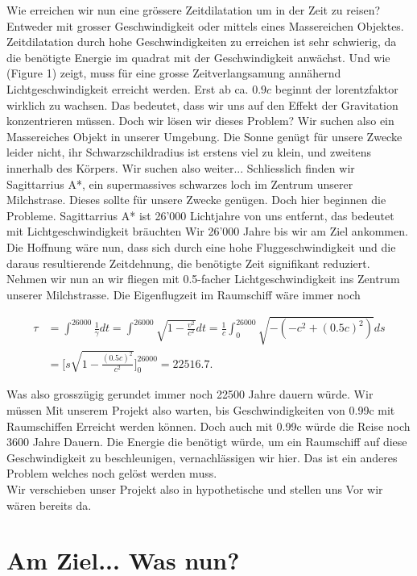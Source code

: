 \begin{refsection}
	Wie erreichen wir nun eine grössere Zeitdilatation um in der Zeit zu reisen? Entweder mit grosser Geschwindigkeit oder mittels eines Massereichen Objektes. Zeitdilatation durch hohe Geschwindigkeiten zu erreichen ist sehr schwierig, da die benötigte Energie im quadrat mit der Geschwindigkeit anwächst. Und wie (Figure 1) zeigt, muss für eine grosse Zeitverlangsamung annähernd Lichtgeschwindigkeit erreicht werden. Erst ab ca. $0.9c$ beginnt der lorentzfaktor wirklich zu wachsen.
	Das bedeutet, dass wir uns auf den Effekt der Gravitation  konzentrieren müssen.
	Doch wir lösen wir dieses Problem? Wir suchen also ein Massereiches Objekt in unserer Umgebung. Die Sonne genügt für unsere Zwecke leider nicht, ihr Schwarzschildradius ist erstens viel zu klein, und zweitens innerhalb des Körpers. Wir suchen also weiter... Schliesslich finden wir Sagittarrius A*, ein supermassives schwarzes loch im Zentrum unserer Milchstrase. Dieses sollte für unsere Zwecke genügen. 
	Doch hier beginnen die Probleme. 
	Sagittarrius A* ist 26'000 Lichtjahre von uns entfernt, das bedeutet mit Lichtgeschwindigkeit bräuchten Wir 26'000 Jahre bis wir am Ziel ankommen. Die Hoffnung wäre nun, dass sich durch eine hohe Fluggeschwindigkeit und die daraus resultierende Zeitdehnung, die benötigte Zeit signifikant reduziert. 
	Nehmen wir nun an wir fliegen mit 0.5-facher Lichtgeschwindigkeit ins Zentrum unserer Milchstrasse. Die Eigenflugzeit im Raumschiff wäre immer noch
	
	\begin{align*}
	\tau
	&= 
	\int_{}^{26000}\frac{1}{\gamma}dt=\int_{}^{26000}\sqrt{1-\frac{v^2}{c^2}}dt
	= 
	\frac{1}{c}\int_{0}^{26000}\sqrt{-(-c^2+(0.5c)^2)}ds\\
	&=
	\biggl[s\sqrt{1-\frac{(0.5c)^{2}}{c^2}}\biggr]_0^{26000}
	=
	22516.7.
	\end{align*}
	
	Was also grosszügig gerundet immer noch 22500 Jahre dauern würde. 
	Wir müssen Mit unserem Projekt also warten, bis Geschwindigkeiten von 0.99c mit Raumschiffen Erreicht werden können. Doch auch mit 0.99c würde die Reise noch 3600 Jahre Dauern. Die Energie die benötigt würde, um ein Raumschiff auf diese Geschwindigkeit zu beschleunigen, vernachlässigen wir hier. Das ist ein anderes Problem welches noch gelöst werden muss.\\
	Wir verschieben unser Projekt also in hypothetische und stellen uns Vor wir wären bereits da.
	
	\section{Am Ziel... Was nun?}
	

\end{refsection}
